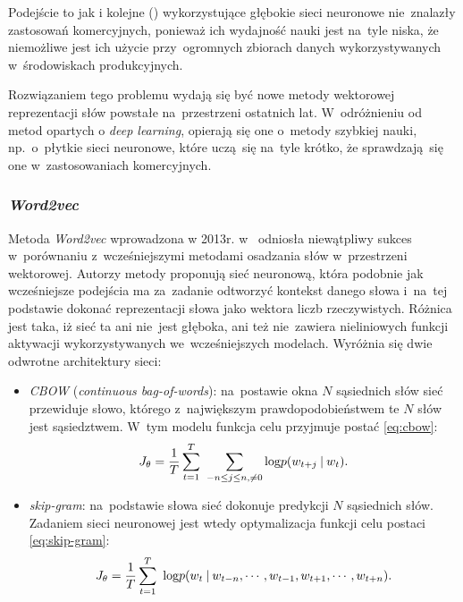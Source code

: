 \documentclass[pl]{minipw} %
\begin{document}
Podejście to jak i kolejne (\cite{c_w}) wykorzystujące głębokie sieci neuronowe nie~znalazły zastosowań komercyjnych, ponieważ ich wydajność nauki jest na~tyle niska, że niemożliwe jest ich użycie przy~ogromnych zbiorach danych wykorzystywanych w~środowiskach produkcyjnych.


Rozwiązaniem tego problemu wydają się być nowe metody wektorowej reprezentacji słów powstałe na~przestrzeni ostatnich lat. W~odróżnieniu od metod opartych o \textit{deep learning}, opierają się one o~metody szybkiej nauki, np.~o~płytkie sieci neuronowe, które uczą~się na~tyle krótko, że sprawdzają~się one w~zastosowaniach komercyjnych.


\subsubsection{\textit{Word2vec}}%

Metoda \textit{Word2vec} wprowadzona w 2013r. w~\cite{word2vec} odniosła niewątpliwy sukces w~porównaniu z~wcześniejszymi metodami osadzania słów w~przestrzeni wektorowej. Autorzy metody proponują sieć neuronową, która podobnie jak wcześniejsze podejścia ma za~zadanie odtworzyć kontekst danego słowa i~na~tej podstawie dokonać reprezentacji słowa jako wektora liczb rzeczywistych. Różnica jest taka, iż sieć ta ani nie~jest głęboka, ani też nie~zawiera nieliniowych funkcji aktywacji wykorzystywanych we~wcześniejszych modelach. Wyróżnia się dwie odwrotne architektury sieci:
\begin{itemize}
	\item \textit{CBOW} (\textit{continuous bag-of-words}): na~postawie okna $N$ sąsiednich słów sieć przewiduje słowo, którego z~największym prawdopodobieństwem te $N$ słów jest sąsiedztwem. W~tym modelu funkcja celu przyjmuje postać \ref{eq:cbow}:
	\begin{equation}
	\label{eq:cbow}
	J_\theta = \frac{1}{T}\sum\limits_{t=1}^T\ \sum\limits_{-n \leq j \leq n , \neq 0} \text{log} \space p(w_{t+j} \: | \: w_t).
	\end{equation}
	\item \textit{skip-gram}: na~podstawie słowa sieć dokonuje predykcji $N$ sąsiednich słów. Zadaniem sieci neuronowej jest wtedy optymalizacja funkcji celu postaci \ref{eq:skip-gram}:
	\begin{equation}
	\label{eq:skip-gram}
	J_\theta = \frac{1}{T}\sum\limits_{t=1}^T\ \text{log} \space p(w_t \: | \: w_{t-n} , \cdots , w_{t-1}, w_{t+1}, \cdots , w_{t+n}).
	\end{equation}
\end{itemize}
\end{document}
